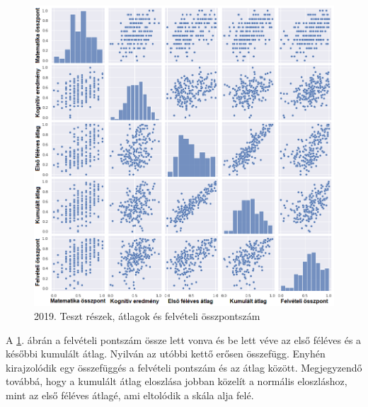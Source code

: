 \documentclass[12pt]{article}
\begin{document}
\begin{figure}[H]
\centering
\includegraphics[width=\textwidth]{kepek/2019minmax4.png}
\caption{2019. Teszt részek, átlagok és felvételi összpontszám}
\label{fig:2019minmax4}
\end{figure}

A \ref{fig:2019minmax4}. ábrán a felvételi pontszám össze lett vonva és be lett véve az első féléves és a későbbi kumulált átlag. Nyilván az utóbbi kettő erősen összefügg. Enyhén kirajzolódik egy összefüggés a felvételi pontszám és az átlag között. Megjegyzendő továbbá, hogy a kumulált átlag eloszlása jobban közelít a normális eloszláshoz, mint az első féléves átlagé, ami eltolódik a skála alja felé.
\end{document}
